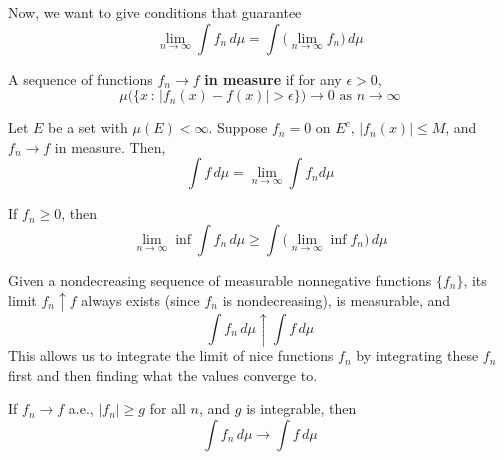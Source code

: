     Now, we want to give conditions that guarantee 
    \begin{equation}
      \lim_{n \rightarrow \infty} \int f_n \,d \mu = \int \big( \lim_{n \rightarrow \infty} f_n \big) \, d\mu
    \end{equation}

    \begin{definition}
      A sequence of functions $f_n \rightarrow f$ \textbf{in measure} if for any $\epsilon > 0$, 
      \begin{equation}
        \mu\big( \{x \,:\, |f_n (x) - f(x)| > \epsilon \}\big) \rightarrow 0 \text{ as } n \rightarrow \infty
      \end{equation}
    \end{definition}

    \begin{theorem}
      Let $E$ be a set with $\mu(E) < \infty$. Suppose $f_n = 0$ on $E^c$, $|f_n (x)| \leq M$, and $f_n \rightarrow f$ in measure. Then, 
      \begin{equation}
        \int f \,d\mu = \lim_{n \rightarrow \infty} \int f_n d\mu
      \end{equation}
    \end{theorem}

    \begin{lemma}
      If $f_n \geq 0$, then
      \begin{equation}
        \lim_{n \rightarrow \infty} \inf \int f_n \,d\mu \geq \int \Big( \lim_{n \rightarrow \infty} \inf f_n \Big) \,d\mu
      \end{equation}
    \end{lemma}

    \begin{theorem}
      Given a nondecreasing sequence of measurable nonnegative functions $\{f_n\}$, its limit $f_n \uparrow f$ always exists (since $f_n$ is nondecreasing), is measurable, and 
      \begin{equation}
        \int f_n \, d\mu \uparrow \int f \, d\mu
      \end{equation}
      This allows us to integrate the limit of nice functions $f_n$ by integrating these $f_n$ first and then finding what the values converge to. 
    \end{theorem}

    \begin{theorem}
      If $f_n \rightarrow f$ a.e., $|f_n| \geq g$ for all $n$, and $g$ is integrable, then 
      \begin{equation}
        \int f_n \,d\mu \rightarrow \int f\, d\mu
      \end{equation}
    \end{theorem}


